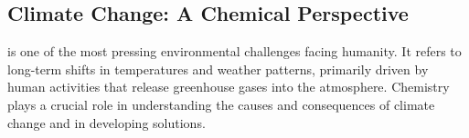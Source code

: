 \subsection{Climate Change: A Chemical Perspective}

 is one of the most pressing environmental challenges facing humanity. It refers to long-term shifts in temperatures and weather patterns, primarily driven by human activities that release greenhouse gases into the atmosphere. Chemistry plays a crucial role in understanding the causes and consequences of climate change and in developing solutions.


